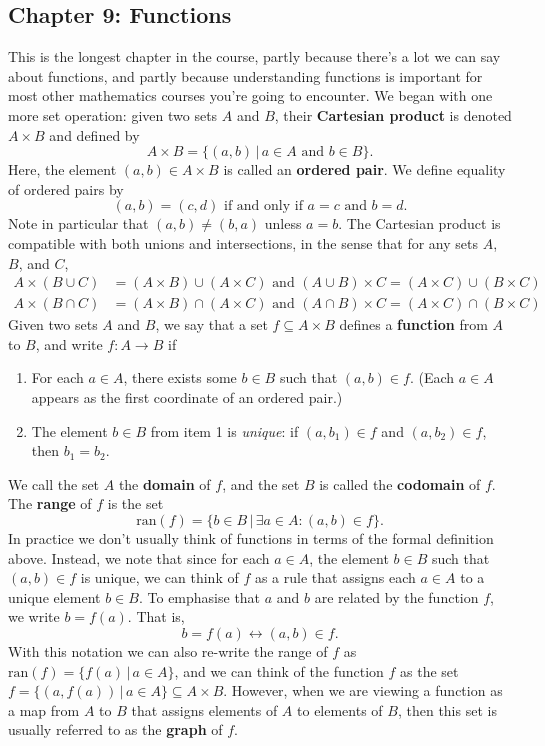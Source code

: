 \documentclass[letterpaper,12pt]{article}
\begin{document}
\subsection*{Chapter 9: Functions}
This is the longest chapter in the course, partly because there's a lot we can say about functions, and partly because understanding functions is important for most other mathematics courses you're going to encounter. We began with one more set operation: given two sets $A$ and $B$, their {\bf Cartesian product} is denoted $A\times B$ and defined by
\[
 A\times B = \{(a,b)\,|\, a\in A \text{ and } b\in B\}.
\]
Here, the element $(a,b)\in A\times B$ is called an {\bf ordered pair}. We define equality of ordered pairs by
\[
 (a,b) = (c,d) \text{ if and only if } a=c \text{ and } b=d.
\]
Note in particular that $(a,b)\neq (b,a)$ unless $a=b$. The Cartesian product is compatible with both unions and intersections, in the sense that for any sets $A$, $B$, and $C$,
\begin{align*}
 A\times (B\cup C) & = (A\times B)\cup (A\times C) \text{ and } (A\cup B)\times C = (A\times C)\cup (B\times C)\\
 A\times (B\cap C) & = (A\times B)\cap (A\times C) \text{ and } (A\cap B)\times C = (A\times C)\cap (B\times C)
\end{align*}
Given two sets $A$ and $B$, we say that a set $f\subseteq A\times B$ defines a {\bf function} from $A$ to $B$, and write $f:A\to B$ if
\begin{enumerate}
 \item For each $a\in A$, there exists some $b\in B$ such that $(a,b)\in f$. (Each $a\in A$ appears as the first coordinate of an ordered pair.)
 \item The element $b\in B$ from item 1 is {\em unique}: if $(a,b_1)\in f$ and $(a,b_2)\in f$, then $b_1=b_2$.
\end{enumerate}
We call the set $A$ the {\bf domain} of $f$, and the set $B$ is called the {\bf codomain} of $f$. The {\bf range} of $f$ is the set
\[
 \mathrm{ran}(f) = \{b\in B \,|\, \exists a\in A : (a,b)\in f\}.
\]
In practice we don't usually think of functions in terms of the formal definition above. Instead, we note that since for each $a\in A$, the element $b\in B$ such that $(a,b)\in f$ is unique, we can think of $f$ as a rule that assigns each $a\in A$ to a unique element $b\in B$. To emphasise that $a$ and $b$ are related by the function $f$, we write $b = f(a)$. That is,
\[
 b = f(a) \leftrightarrow (a,b)\in f.
\]
With this notation we can also re-write the range of $f$ as $\mathrm{ran}(f) = \{f(a) \,|\, a\in A\}$, and we can think of the function $f$ as the set $f = \{(a,f(a)) \,|\, a\in A\}\subseteq A\times B$. However, when we are viewing a function as a map from $A$ to $B$ that assigns elements of $A$ to elements of $B$, then this set is usually referred to as the {\bf graph} of $f$.
\end{document}
